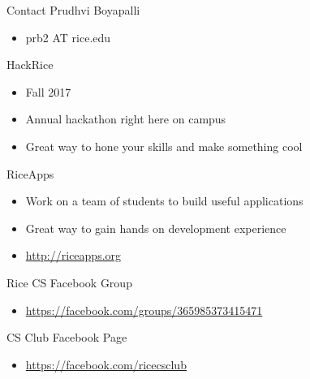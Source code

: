 \documentclass{beamer}
\begin{document}
	\begin{frame}[t]{Contact}
		Prudhvi Boyapalli
		\begin{itemize}
			\item{prb2 AT rice.edu}
		\end{itemize}
		\pause

		HackRice
		\begin{itemize}
			\item{Fall 2017}
			\item{Annual hackathon right here on campus}
			\item{Great way to hone your skills and make something cool}
		\end{itemize}
		\pause

		RiceApps
		\begin{itemize}
			\item{Work on a team of students to build useful applications}
			\item{Great way to gain hands on development experience}
			\item{\url{http://riceapps.org}}
		\end{itemize}
		\pause

		Rice CS Facebook Group
		\begin{itemize}
			\item{\url{https://facebook.com/groups/365985373415471}}
		\end{itemize}

		CS Club Facebook Page
		\begin{itemize}
			\item{\url{https://facebook.com/ricecsclub}}
		\end{itemize}
	\end{frame}
\end{document}
